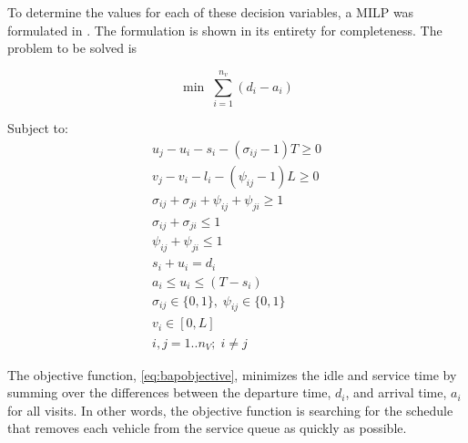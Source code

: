 \documentclass[utf8]{FrontiersinHarvard}
\let\cite\citep                                       %
\begin{document}
To determine the values for each of these decision variables, a MILP was formulated in
\cite{qarebagh-2019-optim-sched}. The formulation is shown in its entirety for completeness.
The problem to be solved is

\begin{equation}
	\label{eq:bapobjective}
	\min\; \sum_{i=1}^{n_v} (d_i - a_i)
\end{equation}

Subject to:
\begin{subequations}
\label{eq:bapconstrs}
\begin{align}
    u_j - u_i - s_i - (\sigma_{ij} - 1)T \geq 0   \label{subeq:baptime}          \\
    v_j - v_i - l_i - (\psi_{ij} - 1)L \geq 0   \label{subeq:bapspace}           \\
    \sigma_{ij} + \sigma_{ji} + \psi_{ij} + \psi_{ji} \geq 1 \label{subeq:bapvalid_pos}     \\
    \sigma_{ij} + \sigma_{ji} \leq 1                   \label{subeq:bapsigma}        \\
    \psi_{ij} + \psi_{ji} \leq 1                   \label{subeq:bapdelta}        \\
    s_i + u_i = d_i                       \label{subeq:bapdetach}       \\
    a_i \leq u_i \leq (T - s_i)                 \label{subeq:bapvalid_starts} \\
    \sigma_{ij} \in \{0,1\},\;\psi_{ij} \in \{0,1\}\; \label{subeq:bapsdspace}      \\
    v_i \in [0, L]                         \label{subeq:bapvspace} \\
    i,j = 1..n_V;\; i \ne j                \label{subeq:ijspace}
\end{align}
\end{subequations}

\noindent The objective function, \autoref{eq:bapobjective}, minimizes the idle and service time by summing over the
differences between the departure time, \(d_i\), and arrival time, \(a_i\) for all visits. In other words, the objective
function is searching for the schedule that removes each vehicle from the service queue as quickly as possible.
\end{document}
